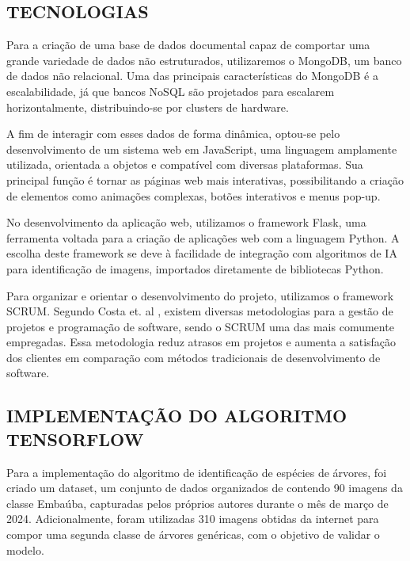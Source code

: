 \subsection*{TECNOLOGIAS }

Para a criação de uma base de dados documental capaz de comportar uma grande variedade de dados não estruturados, utilizaremos o MongoDB, um banco de dados não relacional. Uma das principais características do MongoDB é a escalabilidade, já que bancos NoSQL são projetados para escalarem horizontalmente, distribuindo-se por clusters de hardware.\cite{AWSNoSQL}

A fim de interagir com esses dados de forma dinâmica, optou-se pelo desenvolvimento de um sistema web em JavaScript, uma linguagem amplamente utilizada, orientada a objetos e compatível com diversas plataformas. Sua principal função é tornar as páginas web mais interativas, possibilitando a criação de elementos como animações complexas, botões interativos e menus pop-up.\cite{MDSJavaScript}

No desenvolvimento da aplicação web, utilizamos o framework Flask, uma ferramenta voltada para a criação de aplicações web com a linguagem Python. A escolha deste framework se deve à facilidade de integração com algoritmos de IA para identificação de imagens, importados diretamente de bibliotecas Python.\cite{flask-docs}

Para organizar e orientar o desenvolvimento do projeto, utilizamos o framework SCRUM. Segundo Costa et. al \textcite{costa2022metodologias}, existem diversas metodologias para a gestão de projetos e programação de software, sendo o SCRUM uma das mais comumente empregadas. Essa metodologia reduz atrasos em projetos e aumenta a satisfação dos clientes em comparação com métodos tradicionais de desenvolvimento de software.

\subsection*{IMPLEMENTAÇÃO DO ALGORITMO TENSORFLOW}

Para a implementação do algoritmo de identificação de espécies de árvores, foi criado um dataset, um conjunto de dados organizados de contendo 90 imagens da classe Embaúba, capturadas pelos próprios autores durante o mês de março de 2024. Adicionalmente, foram utilizadas 310 imagens obtidas da internet para compor uma segunda classe de árvores genéricas, com o objetivo de validar o modelo.


